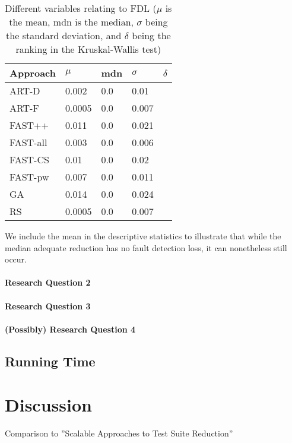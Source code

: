 \begin{table}[htpb]
	\caption[FDL statistical results, adequate]{Different variables relating to FDL ($\mu$ is the mean, mdn is the median, $\sigma$ being the standard deviation, and $\delta$ being the ranking in the Kruskal-Wallis test)}\label{tsr_stats}
	\centering
	\begin{tabular}{l l l l l}
	Approach & $\mu$ & mdn & $\sigma$ & $\delta$ \\
	\midrule
	ART-D & 0.002 & 0.0 & 0.01 \\
	ART-F & 0.0005 & 0.0 & 0.007 \\
	FAST++ & 0.011 & 0.0 & 0.021 \\
	FAST-all & 0.003 & 0.0 & 0.006 \\
	FAST-CS & 0.01 & 0.0 & 0.02 \\
	FAST-pw & 0.007 & 0.0 & 0.011 \\
	GA & 0.014 & 0.0 & 0.024 \\
	RS & 0.0005 & 0.0 & 0.007 \\
	\bottomrule
	\end{tabular}
\end{table}

We include the mean in the descriptive statistics to illustrate that
while the median adequate reduction has no fault detection loss, it can
nonetheless still occur.

\paragraph{Research Question 2}

\paragraph{Research Question 3}

\paragraph{(Possibly) Research Question 4}

\subsection{Running Time}

\section{Discussion}

Comparison to ''Scalable Approaches to Test Suite Reduction''

